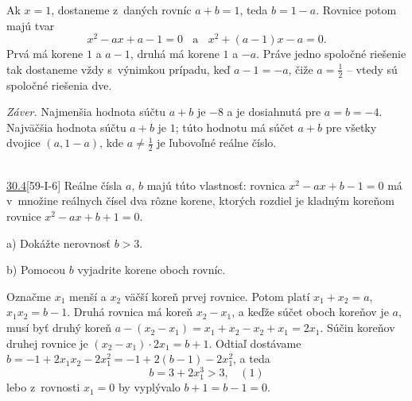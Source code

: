 Ak $x = 1$, dostaneme z~daných rovníc $a + b = 1$, teda $b = 1-a$. Rovnice potom majú tvar
$$x^2-ax + a-1 = 0 \ \ \ \ \text{a} \ \ \ \ x^2 + (a-1)x-a = 0.$$
Prvá má korene $1$ a $a-1$, druhá má korene $1$ a $-a$. Práve jedno spoločné riešenie tak dostaneme vždy s~výnimkou prípadu, keď $a-1 = -a$, čiže $a = \frac{1}{2}$ -- vtedy sú spoločné riešenia dve.

\textit{Záver.} Najmenšia hodnota súčtu $a + b$ je $-8$ a je dosiahnutá pre $a = b = -4$. Najväčšia hodnota súčtu $a + b$ je $1$; túto hodnotu má súčet $a + b$ pre všetky dvojice $(a, 1-a)$, kde $a\neq \frac{1}{2}$ je ľubovoľné reálne číslo.\\
\\
\begin{tcolorbox}[breakable,notitle,boxrule=0pt,colback=light-gray,colframe=light-gray]\ul{30.4}[59-I-6] Reálne čísla $a$, $b$ majú túto vlastnosť: rovnica $x^2 -ax+b-1 = 0$ má v~množine reálnych čísel dva rôzne korene, ktorých rozdiel je kladným koreňom rovnice $x^2 - ax + b + 1 = 0$.

a) Dokážte nerovnosť $b > 3$.

b) Pomocou $b$ vyjadrite korene oboch rovníc.

\end{tcolorbox}

\rieh  Označme $x_1$ menší a $x_2$ väčší koreň prvej rovnice. Potom platí $x_1 + x_2 = a$, $x_1 x_2 = b - 1$. Druhá rovnica má koreň $x_2 - x_1$, a keďže súčet oboch koreňov je $a$, musí byť druhý koreň $a - (x_2 - x_1 ) = x_1 + x_2 - x_2 + x_1 = 2x_1$. Súčin koreňov druhej rovnice je $(x_2 -x_1 )\cdot2x_1 = b+1$. Odtiaľ dostávame $b = -1+2x_1 x_2 -2x_1^2= -1+2(b-1)-2x_1^2$, a teda
$$b = 3 + 2x_1^3> 3, \ \ \ \  (1)$$
lebo z~rovnosti $x_1 = 0$ by vyplývalo $b + 1 = b - 1 = 0$.

